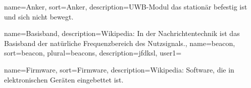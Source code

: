 %
%
%
%


%
%
%



{
	name={Anker}, sort={Anker},
	description={UWB-Modul das stationär befestig ist und sich nicht bewegt.}
}

{
	name={Basisband},
	description={Wikipedia: In der Nachrichtentechnik ist das Basisband der natürliche Frequenzbereich des Nutzsignals.},
}
{
	name={beacon}, sort={beacon}, plural={beacons},
	description={jfdksl},
	user1={
	}
}




{
	name={Firmware},
	sort={Firmware},
	description={Wikipedia: Software, die in elektronischen Geräten eingebettet ist.}
}

